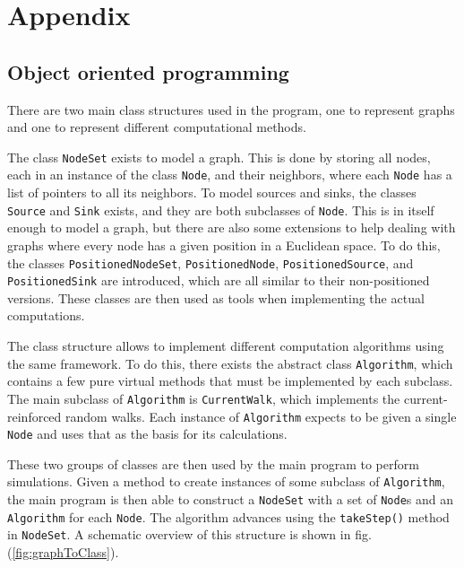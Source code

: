 \section{Appendix}
\label{sec:appendix}

\subsection{Object oriented programming}

There are two main class structures used in the program, one to represent graphs and one to represent different computational methods.

The class \texttt{NodeSet} exists to model a graph. This is done by storing all nodes, each in an instance of the class \texttt{Node}, and their neighbors, where each \texttt{Node} has a list of pointers to all its neighbors. To model sources and sinks, the classes \texttt{Source} and \texttt{Sink} exists, and they are both subclasses of \texttt{Node}. This is in itself enough to model a graph, but there are also some extensions to help dealing with graphs where every node has a given position in a Euclidean space. To do this, the classes \texttt{PositionedNodeSet}, \texttt{PositionedNode}, \texttt{PositionedSource}, and \texttt{PositionedSink} are introduced, which are all similar to their non-positioned versions. These classes are then used as tools when implementing the actual computations.

The class structure allows to implement different computation algorithms using the same framework. To do this, there exists the abstract class \texttt{Algorithm}, which contains a few pure virtual methods that must be implemented by each subclass. The main subclass of \texttt{Algorithm} is \texttt{CurrentWalk}, which implements the current-reinforced random walks. Each instance of \texttt{Algorithm} expects to be given a single \texttt{Node} and uses that as the basis for its calculations.

These two groups of classes are then used by the main program to perform simulations. Given a method to create instances of some subclass of \texttt{Algorithm}, the main program is then able to construct a \texttt{NodeSet} with a set of \texttt{Node}s and an \texttt{Algorithm} for each \texttt{Node}. The algorithm advances using the \texttt{takeStep()} method in \texttt{NodeSet}. A schematic overview of this structure is shown in fig. (\ref{fig:graphToClass}).

